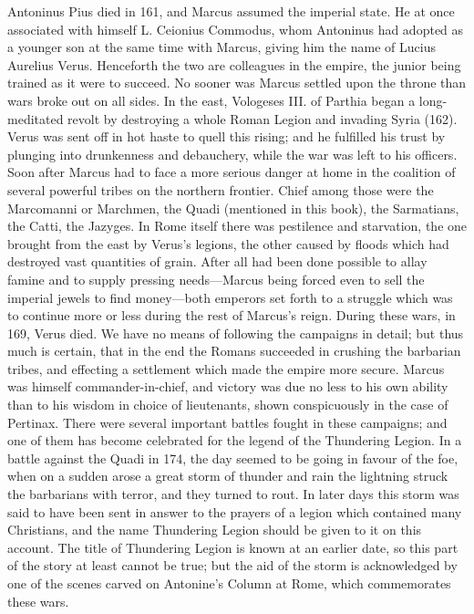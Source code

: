 Antoninus Pius died in 161, and Marcus assumed the imperial state. He at once
associated with himself L. Ceionius Commodus, whom Antoninus had adopted as a
younger son at the same time with Marcus, giving him the name of Lucius
Aurelius Verus. Henceforth the two are colleagues in the empire, the junior
being trained as it were to succeed. No sooner was Marcus settled upon the
throne than wars broke out on all sides. In the east, Vologeses III. of Parthia
began a long-meditated revolt by destroying a whole Roman Legion and invading
Syria (162). Verus was sent off in hot haste to quell this rising; and he
fulfilled his trust by plunging into drunkenness and debauchery, while the war
was left to his officers. Soon after Marcus had to face a more serious danger
at home in the coalition of several powerful tribes on the northern frontier.
Chief among those were the Marcomanni or Marchmen, the Quadi (mentioned in this
book), the Sarmatians, the Catti, the Jazyges. In Rome itself there was
pestilence and starvation, the one brought from the east by Verus's legions,
the other caused by floods which had destroyed vast quantities of grain. After
all had been done possible to allay famine and to supply pressing
needs—Marcus being forced even to sell the imperial jewels to find
money—both emperors set forth to a struggle which was to continue more or
less during the rest of Marcus's reign. During these wars, in 169, Verus died.
We have no means of following the campaigns in detail; but thus much is
certain, that in the end the Romans succeeded in crushing the barbarian tribes,
and effecting a settlement which made the empire more secure. Marcus was
himself commander-in-chief, and victory was due no less to his own ability than
to his wisdom in choice of lieutenants, shown conspicuously in the case of
Pertinax. There were several important battles fought in these campaigns; and
one of them has become celebrated for the legend of the Thundering Legion. In a
battle against the Quadi in 174, the day seemed to be going in favour of the
foe, when on a sudden arose a great storm of thunder and rain the lightning
struck the barbarians with terror, and they turned to rout. In later days this
storm was said to have been sent in answer to the prayers of a legion which
contained many Christians, and the name Thundering Legion should be given to it
on this account. The title of Thundering Legion is known at an earlier date, so
this part of the story at least cannot be true; but the aid of the storm is
acknowledged by one of the scenes carved on Antonine's Column at Rome, which
commemorates these wars.

